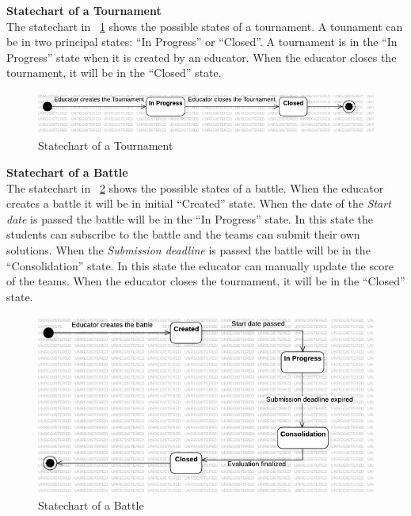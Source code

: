 \textbf{Statechart of a Tournament} \\
The statechart in \figurename~\ref{fig:statechart_tournament} shows the possible states of a tournament. A tounament can be in two principal states: ``In Progress'' or ``Closed''. A tournament is in the ``In Progress'' state when it is created by an educator. When the educator closes the tournament, it will be in the ``Closed'' state.
\begin{figure}[H]
    \centering
    \includegraphics[width=1\textwidth]{Diagrams/TournamentStateChart.jpg}
    \caption{Statechart of a Tournament}
    \label{fig:statechart_tournament}
\end{figure}
\textbf{Statechart of a Battle} \\
The statechart in \figurename~\ref{fig:statechart_battle} shows the possible states of a battle. When the educator creates a battle it will be in initial ``Created'' state. When the date of the \textit{Start date} is passed the battle will be in the ``In Progress'' state. In this state the students can subscribe to the battle and the teams can submit their own solutions. When the \textit{Submission deadline} is passed the battle will be in the ``Consolidation'' state. In this state the educator can manually update the score of the teams. When the educator closes the tournament, it will be in the ``Closed'' state.
\begin{figure}[H]
    \centering
    \includegraphics[width=1\textwidth]{Diagrams/BattleStateChart.jpg}
    \caption{Statechart of a Battle}
    \label{fig:statechart_battle}
\end{figure}

